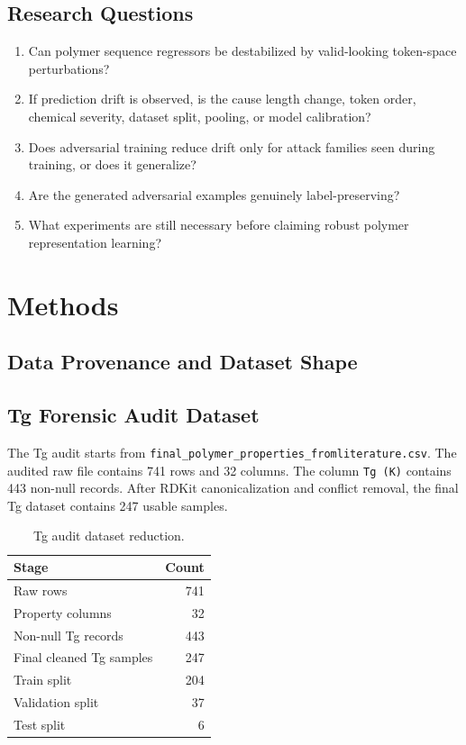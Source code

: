 \documentclass[11pt]{article}
\begin{document}
\subsection{Research Questions}

\begin{enumerate}
  \item Can polymer sequence regressors be destabilized by valid-looking token-space perturbations?
  \item If prediction drift is observed, is the cause length change, token order, chemical severity, dataset split, pooling, or model calibration?
  \item Does adversarial training reduce drift only for attack families seen during training, or does it generalize?
  \item Are the generated adversarial examples genuinely label-preserving?
  \item What experiments are still necessary before claiming robust polymer representation learning?
\end{enumerate}

\section{Methods}

\subsection{Data Provenance and Dataset Shape}

\subsection{Tg Forensic Audit Dataset}

The Tg audit starts from \texttt{final\_polymer\_properties\_fromliterature.csv}.
The audited raw file contains 741 rows and 32 columns. The column \texttt{Tg (K)}
contains 443 non-null records. After RDKit canonicalization and conflict removal,
the final Tg dataset contains 247 usable samples.

\begin{table}[H]
\centering
\caption{Tg audit dataset reduction.}
\begin{tabular}{@{}lr@{}}
\toprule
Stage & Count \\
\midrule
Raw rows & 741 \\
Property columns & 32 \\
Non-null Tg records & 443 \\
Final cleaned Tg samples & 247 \\
Train split & 204 \\
Validation split & 37 \\
Test split & 6 \\
\bottomrule
\end{tabular}
\end{table}
\end{document}
